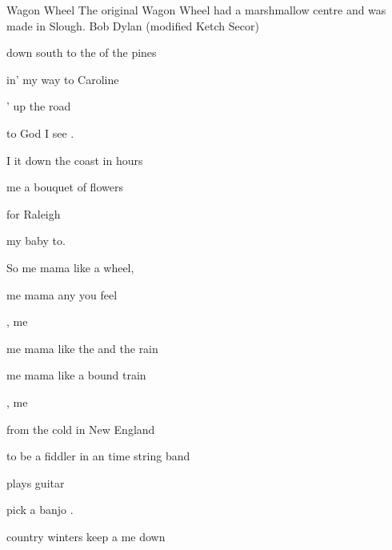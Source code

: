 \begin{SBSong}{Wagon Wheel}
  {The original Wagon Wheel had a marshmallow centre and was made in Slough.}
  {Bob Dylan (modified Ketch Secor)}
  \begin{SBVerse}
     down south to the  of the pines

    in' my way to  Caroline

    ' up the road

     to God I see .
  \end{SBVerse}
  \begin{SBVerse}
    I  it down the coast in   hours
    
     me a bouquet of  flowers
    
     for Raleigh
    
     my baby to.
  \end{SBVerse} 
  \begin{SBChorus}  
    So  me mama like a  wheel,
    
    me mama any you feel
    
    ,   me
    
     me mama like the  and the rain
    
     me mama like a bound train
    
    ,   me

  \end{SBChorus} 
  \begin{SBVerse}  
     from the cold  in New England
    
     to be a fiddler in an time string band
    
     plays guitar
    
     pick a banjo .
  \end{SBVerse} 
  \begin{SBVerse}  
     country winters keep a  me down
    

\end{SBVerse}
\end{SBSong}
